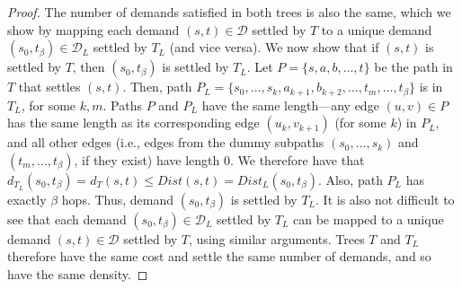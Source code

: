 \begin{proof}
    The number of demands satisfied in both trees is also the same, which we show by mapping each demand $(s,t) \in \mathcal{D}$ settled by $T$ to a unique demand $(s_0, t_\beta) \in \mathcal{D}_L$ settled by $T_L$ (and vice versa). We now show that if $(s,t)$ is settled by $T$, then $(s_0, t_\beta)$ is settled by $T_L$. Let $P = \{s, a, b, \dots, t\}$ be the path in $T$ that settles $(s,t)$. Then, path $P_L = \{s_0, \dots, s_k, a_{k+1}, b_{k+2}, \dots, t_{m}, \dots , t_\beta \}$ is in $T_L$, for some $k, m$. Paths $P$ and $P_L$ have the same length---any edge $(u,v) \in P$ has the same length as its corresponding edge $(u_k, v_{k+1})$ (for some $k$) in $P_L$, and all other edges (i.e., edges from the dummy subpaths $(s_0, \dots, s_k)$ and $(t_m, \dots, t_\beta)$, if they exist) have length $0$. We therefore have that $d_{T_L}(s_0,t_\beta) = d_T(s,t) \leq  Dist(s,t) = Dist_L(s_0,t_\beta)$. Also, path $P_L$ has exactly $\beta$ hops. Thus, demand $(s_0, t_\beta)$ is settled by $T_L$. It is also not difficult to see that each demand $(s_0, t_\beta) \in \mathcal{D}_L$ settled by $T_L$ can be mapped to a unique demand $(s,t) \in \mathcal{D}$ settled by $T$, using similar arguments. Trees $T$ and $T_L$ therefore have the same cost and settle the same number of demands, and so have the same density. 
\end{proof}

